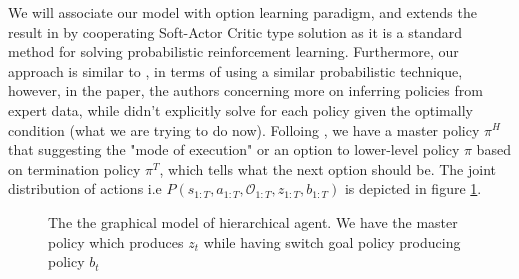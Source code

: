 \label{sec:chap4-single-soft-HRL}
We will associate our model with option learning paradigm, and extends the result in \cite{igl2019multitask} by cooperating Soft-Actor Critic type solution as it is a standard method for solving probabilistic reinforcement learning. Furthermore, our approach is similar to \cite{daniel2016probabilistic}, in terms of using a similar probabilistic technique, however, in the paper, the authors concerning more on inferring policies from expert data, while didn't explicitly solve for each policy given the optimally condition (what we are trying to do now). Folloing \cite{igl2019multitask}, we have a master policy $\pi^H$ that suggesting the "mode of execution" or an option to lower-level policy $\pi$ based on termination policy $\pi^T$, which tells what the next option should be. The joint distribution of actions i.e $P(s_{1:T}, a_{1:T}, \mathcal{O}_{1:T}, z_{1:T}, b_{1:T})$ is depicted in figure \ref{fig:chap4-single-agent-hierarchical}.
\begin{figure}[ht]
    \begin{minipage}[t]{0.5\linewidth}
    \centering
    \end{minipage}%
    \begin{minipage}[t]{0.5\linewidth}
    \caption{The the graphical model of hierarchical agent. We have the master policy which produces $z_t$ while having switch goal policy producing policy $b_t$}
    \label{fig:chap4-single-agent-hierarchical}
    \end{minipage}
\end{figure}
